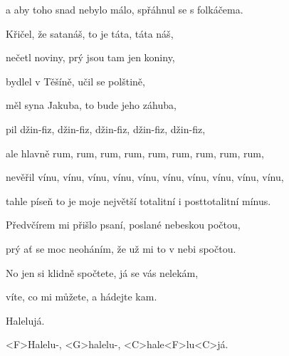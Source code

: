 a aby toho snad nebylo málo, spřáhnul se s folkáčema.

Křičel, že satanáš, to je táta, táta náš,

nečetl noviny, prý jsou tam jen koniny,

bydlel v Těšíně, učil se polštině,

měl syna Jakuba, to bude jeho záhuba,

pil džin-fiz, džin-fiz, džin-fiz, džin-fiz, džin-fiz,

ale hlavně rum, rum, rum, rum, rum, rum, rum, rum, rum,

nevěřil vínu, vínu, vínu, vínu, vínu, vínu, vínu, vínu, vínu, vínu,

tahle píseň to je moje největší totalitní i posttotalitní mínus.

Předvčírem mi přišlo psaní, poslané nebeskou počtou,

prý ať se moc neoháním, že už mi to v nebi spočtou.

No jen si klidně spočtete, já se vás nelekám,

víte, co mi můžete, a hádejte kam.

Halelujá.
\ks

\zr\kr

<F>Halelu-, <G>halelu-, <C>hale<F>lu<C>já.

\kp
